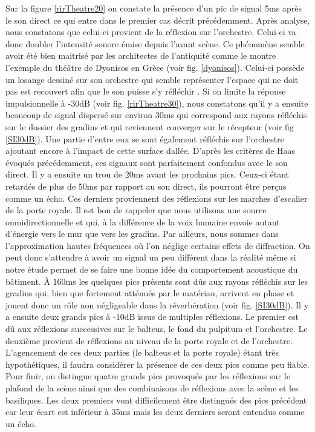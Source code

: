 Sur la figure \ref{rirTheatre20} on constate la présence d'un pic de signal 5ms après le son direct ce qui entre dans le premier cas décrit précédemment. Après analyse, nous constatons que celui-ci provient de la réflexion sur l'orchestre. Celui-ci va donc doubler l'intensité sonore émise depuis l'avant scène. Ce phénomène semble avoir été bien maitrisé par les architectes de l'antiquité comme le montre l'exemple du théâtre de Dyonisos en Grèce (voir fig. \ref{dyonisos}). Celui-ci possède un losange dessiné sur son orchestre qui semble représenter l'espace qui ne doit pas est recouvert afin que le son puisse s'y réfléchir \cite[p.118-120]{canac}. Si on limite la réponse impulsionnelle à -30dB (voir fig. \ref{rirTheatre30}), nous constatons qu'il y a ensuite beaucoup de signal dispersé sur environ 30ms qui correspond aux rayons réfléchis sur le dossier des gradins et qui reviennent converger sur le récepteur (voir fig \ref{SI30dB}). Une partie d'entre eux se sont également réfléchis sur l'orchestre ajoutant encore à l'impact de cette surface dallée. D'après les critères de Haas évoqués précédemment, ces signaux sont parfaitement confondus avec le son direct. Il y a ensuite un trou de 20ms avant les prochains pics. Ceux-ci étant retardés de plus de 50ms par rapport au son direct, ils pourront être perçus comme un écho. Ces derniers proviennent des réflexions sur les marches d'escalier de la porte royale. Il est bon de rappeler que nous utilisons une source omnidirectionnelle et qui, à la différence de la voix humaine envoie autant d'énergie vers le mur que vers les gradins. Par ailleurs, nous sommes dans l'approximation hautes fréquences où l'on néglige certains effets de diffraction. On peut donc s'attendre à avoir un signal un peu différent dans la réalité même si notre étude permet de se faire une bonne idée du comportement acoustique du bâtiment. À 160ms les quelques pics présents sont dûs aux rayons réfléchis sur les gradins qui, bien que fortement atténués par le matériau, arrivent en phase et jouent donc un rôle non négligeable dans la réverbération (voir fig. \ref{SI30dB}). Il y a ensuite deux grands pics à -10dB issus de multiples réflexions. Le premier est dû aux réflexions successives sur le \gls{balteus}, le fond du \gls{pulpitum} et l'orchestre. Le deuxième provient de réflexions au niveau de la porte royale et de l'orchestre. L'agencement de ces deux parties (le \gls{balteus} et la porte royale) étant très hypothétiques, il faudra considérer la présence de ces deux pics comme peu fiable. Pour finir, on distingue quatre grands pics provoqués par les réflexions sur le plafond de la scène ainsi que des combinaisons de réflexions avec la scène et les basiliques. Les deux premiers vont difficilement être distingués des pics précédent car leur écart est inférieur à 35ms mais les deux derniers seront entendus comme un écho.

